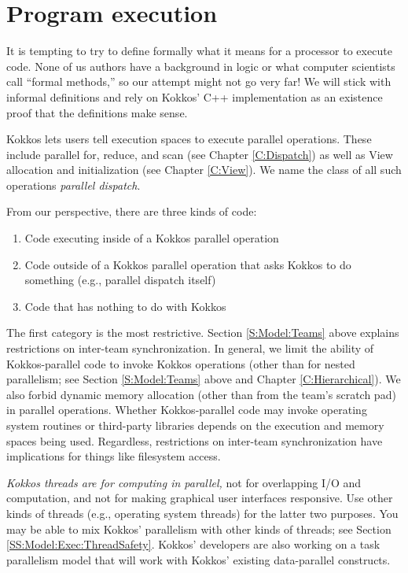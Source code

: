 \section{Program execution}\label{S:Model:Exec}

It is tempting to try to define formally what it means for a processor to execute code.
None of us authors have a background in logic or what computer scientists call ``formal methods,''
so our attempt might not go very far!
We will stick with informal definitions and rely on Kokkos' C++ implementation
as an existence proof that the definitions make sense.

Kokkos lets users tell execution spaces to execute parallel operations.
These include parallel for, reduce, and scan (see Chapter \ref{C:Dispatch})
as well as View allocation and initialization (see Chapter \ref{C:View}).
We name the class of all such operations \emph{parallel dispatch}.

From our perspective, there are three kinds of code:
\begin{enumerate}
\item Code executing inside of a Kokkos parallel operation
\item Code outside of a Kokkos parallel operation that asks Kokkos to
  do something (e.g., parallel dispatch itself)
\item Code that has nothing to do with Kokkos
\end{enumerate}
The first category is the most restrictive.
Section \ref{S:Model:Teams} above explains restrictions on inter-team synchronization.
In general, we limit the ability of Kokkos-parallel code to invoke Kokkos operations
(other than for nested parallelism; 
see Section \ref{S:Model:Teams} above and Chapter \ref{C:Hierarchical}).
We also forbid dynamic memory allocation (other than from the team's scratch pad) in parallel operations.
Whether Kokkos-parallel code may invoke operating system routines or third-party libraries
depends on the execution and memory spaces being used.
Regardless, restrictions on inter-team synchronization have implications for things like filesystem access.

\emph{Kokkos threads are for computing in parallel,}
not for overlapping I/O and computation,
and not for making graphical user interfaces responsive.
Use other kinds of threads (e.g., operating system threads) for the latter two purposes.
You may be able to mix Kokkos' parallelism with other kinds of threads;
see Section \ref{SS:Model:Exec:ThreadSafety}.
Kokkos' developers are also working on a task parallelism model
that will work with Kokkos' existing data-parallel constructs.

